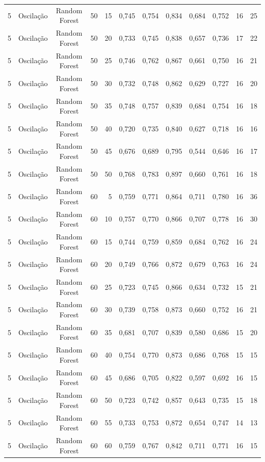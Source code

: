 \begin{longtable}{ccclrrrrrrrr}
5 & Oscilação & Random Forest & 50 & 15 & 0,745 & 0,754 & 0,834 & 0,684 & 0,752 & 16 & 25 \\
5 & Oscilação & Random Forest & 50 & 20 & 0,733 & 0,745 & 0,838 & 0,657 & 0,736 & 17 & 22 \\
5 & Oscilação & Random Forest & 50 & 25 & 0,746 & 0,762 & 0,867 & 0,661 & 0,750 & 16 & 21 \\
5 & Oscilação & Random Forest & 50 & 30 & 0,732 & 0,748 & 0,862 & 0,629 & 0,727 & 16 & 20 \\
5 & Oscilação & Random Forest & 50 & 35 & 0,748 & 0,757 & 0,839 & 0,684 & 0,754 & 16 & 18 \\
5 & Oscilação & Random Forest & 50 & 40 & 0,720 & 0,735 & 0,840 & 0,627 & 0,718 & 16 & 16 \\
5 & Oscilação & Random Forest & 50 & 45 & 0,676 & 0,689 & 0,795 & 0,544 & 0,646 & 16 & 17 \\
5 & Oscilação & Random Forest & 50 & 50 & 0,768 & 0,783 & 0,897 & 0,660 & 0,761 & 16 & 18 \\
5 & Oscilação & Random Forest & 60 & 5 & 0,759 & 0,771 & 0,864 & 0,711 & 0,780 & 16 & 36 \\
5 & Oscilação & Random Forest & 60 & 10 & 0,757 & 0,770 & 0,866 & 0,707 & 0,778 & 16 & 30 \\
5 & Oscilação & Random Forest & 60 & 15 & 0,744 & 0,759 & 0,859 & 0,684 & 0,762 & 16 & 24 \\
5 & Oscilação & Random Forest & 60 & 20 & 0,749 & 0,766 & 0,872 & 0,679 & 0,763 & 16 & 24 \\
5 & Oscilação & Random Forest & 60 & 25 & 0,723 & 0,745 & 0,866 & 0,634 & 0,732 & 15 & 21 \\
5 & Oscilação & Random Forest & 60 & 30 & 0,739 & 0,758 & 0,873 & 0,660 & 0,752 & 16 & 21 \\
5 & Oscilação & Random Forest & 60 & 35 & 0,681 & 0,707 & 0,839 & 0,580 & 0,686 & 15 & 20 \\
5 & Oscilação & Random Forest & 60 & 40 & 0,754 & 0,770 & 0,873 & 0,686 & 0,768 & 15 & 15 \\
5 & Oscilação & Random Forest & 60 & 45 & 0,686 & 0,705 & 0,822 & 0,597 & 0,692 & 16 & 15 \\
5 & Oscilação & Random Forest & 60 & 50 & 0,723 & 0,742 & 0,857 & 0,643 & 0,735 & 15 & 18 \\
5 & Oscilação & Random Forest & 60 & 55 & 0,733 & 0,753 & 0,872 & 0,654 & 0,747 & 14 & 13 \\
5 & Oscilação & Random Forest & 60 & 60 & 0,759 & 0,767 & 0,842 & 0,711 & 0,771 & 16 & 15 \\

\end{longtable}
